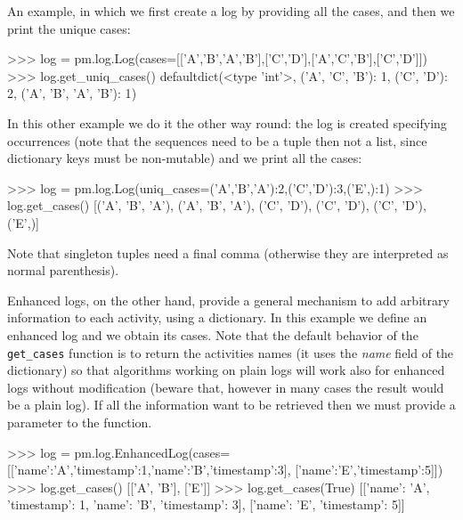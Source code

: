 \documentclass[a4paper,10pt]{book}
\begin{document}
An example, in which we first create a log by providing all the cases, and then we print the unique cases:
\begin{pycode}
>>> log = pm.log.Log(cases=[['A','B','A','B'],['C','D'],['A','C','B'],['C','D']])
>>> log.get_uniq_cases()
defaultdict(<type 'int'>, {('A', 'C', 'B'): 1, ('C', 'D'): 2, ('A', 'B', 'A', 'B'): 1})
\end{pycode}


In this other example we do it the other way round: the log is created specifying occurrences (note that the sequences need to be a tuple then not a list, since dictionary keys must be non-mutable) and we print all the cases:\\
\begin{pycode}
>>> log = pm.log.Log(uniq_cases={('A','B','A'):2,('C','D'):3,('E',):1})
>>> log.get_cases()
[('A', 'B', 'A'), ('A', 'B', 'A'), ('C', 'D'), ('C', 'D'), ('C', 'D'), ('E',)]
\end{pycode}

Note that singleton tuples need a final comma (otherwise they are interpreted as normal parenthesis).

Enhanced logs, on the other hand, provide a general mechanism to add arbitrary information to each activity, using a dictionary. In this example we define an enhanced log and we obtain its cases. Note that the default behavior of the \texttt{get\_cases} function is to return the activities names (it uses the \emph{name} field of the dictionary) so that algorithms working on plain logs will work also for enhanced logs without modification (beware that, however in many cases the result would be a plain log). If all the information want to be retrieved then we must provide a parameter to the function.\\
\begin{pycode}
>>> log = pm.log.EnhancedLog(cases=[[{'name':'A','timestamp':1},{'name':'B','timestamp':3}],
				    [{'name':'E','timestamp':5}]])
>>> log.get_cases()
[['A', 'B'], ['E']]
>>> log.get_cases(True)
[[{'name': 'A', 'timestamp': 1}, {'name': 'B', 'timestamp': 3}],
 [{'name': 'E', 'timestamp': 5}]]
\end{pycode}
\end{document}
